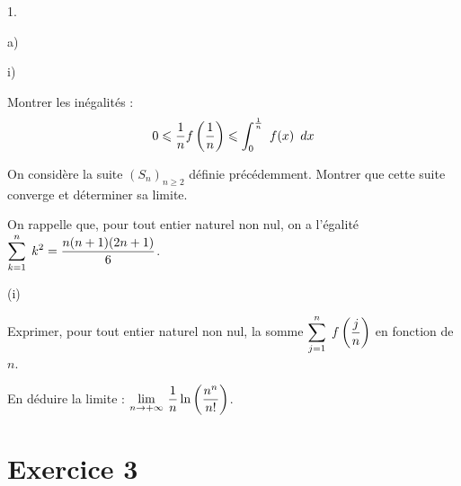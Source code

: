 \documentclass[11pt]{article}%
\begin{document}
\begin{noliste}{1.}
\begin{noliste}{a)}
\begin{nonoliste}{i)}
\item Montrer les inégalités : 
\[
0\leqslant \dfrac{1}{n}f\left( \dfrac{1}{n}\right) \leqslant
\displaystyle \int_{0}^{\frac{1}{n}}\ f(x)\,\ dx
\]
\end{nonoliste}

\item On considère la suite $(S_{n})_{n\geq 2}$ définie précédemment.
Montrer que cette suite converge et déterminer sa limite.

\item On rappelle que, pour tout entier naturel non nul, on a l'égalité
$\displaystyle\sum\limits_{k = 1}^{n}\hspace{.1cm}k^{2} = \dfrac{n(n + 1)(2n + 1)}{6}$.

\begin{nonoliste}{(i)}
\item Exprimer, pour tout entier naturel non nul, la somme $\displaystyle\sum\limits_{j =
1}^{n}\hspace{.1cm}f\left( \dfrac{j}{n}\right) $ en fonction de $n$.

\item En déduire la limite : ${\displaystyle \lim_{n\rightarrow + \infty
} \ }\dfrac{1}{n}\ln \left( \dfrac{n^{n}}{n!}\right) $.
\end{nonoliste}
\end{noliste}
\end{noliste}

\newpage

\section*{Exercice 3}
\end{document}
